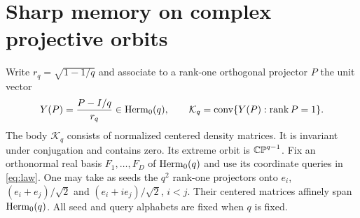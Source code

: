 \section{Sharp memory on complex projective orbits}\label{sec:projective}
Write $r_q=\sqrt{1-1/q}$ and associate to a rank-one orthogonal
projector $P$ the unit vector
\begin{equation}\label{eq:pure-orbit}
 Y(P)=\frac{P-I/q}{r_q}\in\operatorname{Herm}_0(q),\qquad
 \mathcal K_q=\operatorname{conv}\{Y(P):\operatorname{rank} P=1\}.
\end{equation}
The body $\mathcal K_q$ consists of normalized centered density matrices.
It is invariant under conjugation and contains zero. Its extreme orbit
is $\mathbb{CP}^{q-1}$. Fix an orthonormal real basis $F_1,\ldots,F_D$ of
$\operatorname{Herm}_0(q)$ and use its coordinate queries in \eqref{eq:law}.
One may take as seeds the $q^2$ rank-one projectors onto
$e_i$, $(e_i+e_j)/\sqrt2$ and $(e_i+i e_j)/\sqrt2$, $i<j$.
Their centered matrices affinely span $\operatorname{Herm}_0(q)$. All seed and query
alphabets are fixed when $q$ is fixed.

